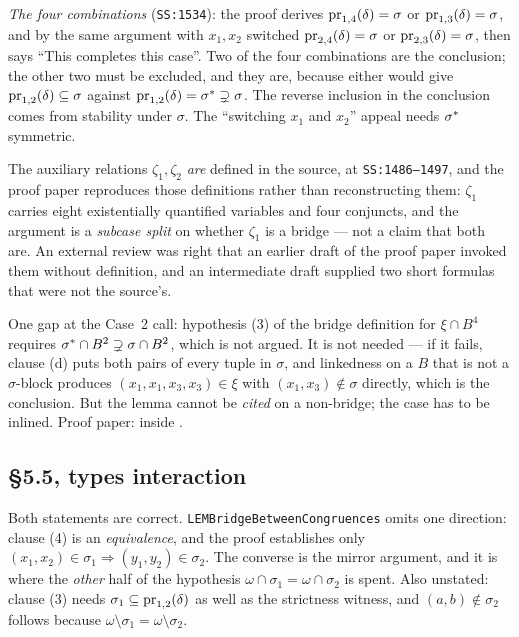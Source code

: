 \emph{The four combinations} (\texttt{SS:1534}): the proof derives
$\operatorname*{pr}_{1,4}(\delta)=\sigma$ or $\operatorname*{pr}_{1,3}(\delta)=\sigma$, and by the same
argument with $x_{1},x_{2}$ switched $\operatorname*{pr}_{2,4}(\delta)=\sigma$ or
$\operatorname*{pr}_{2,3}(\delta)=\sigma$, then says ``This completes this case''. Two of
the four combinations are the conclusion; the other two must be excluded, and
they are, because either would give $\operatorname*{pr}_{1,2}(\delta)\subseteq\sigma$
against $\operatorname*{pr}_{1,2}(\delta)=\sigma^{*}\supsetneq\sigma$. The reverse
inclusion in the conclusion comes from stability under $\sigma$. The
``switching $x_{1}$ and $x_{2}$'' appeal needs $\sigma^{*}$ symmetric.

The auxiliary relations $\zeta_{1},\zeta_{2}$ \emph{are} defined in the source,
at \texttt{SS:1486--1497}, and the proof paper reproduces those definitions
rather than reconstructing them: $\zeta_{1}$ carries eight existentially
quantified variables and four conjuncts, and the argument is a \emph{subcase
split} on whether $\zeta_{1}$ is a bridge --- not a claim that both are. An
external review was right that an earlier draft of the proof paper invoked them
without definition, and an intermediate draft supplied two short formulas that
were not the source's.

One gap at the Case~2 call: hypothesis (3) of the bridge definition for
$\xi\cap B^{4}$ requires $\sigma^{*}\cap B^{2}\supsetneq\sigma\cap B^{2}$,
which is not argued. It is not needed --- if it fails, clause (d) puts both
pairs of every tuple in $\sigma$, and linkedness on a $B$ that is not a
$\sigma$-block produces $(x_{1},x_{1},x_{3},x_{3})\in\xi$ with
$(x_{1},x_{3})\notin\sigma$ directly, which is the conclusion. But the lemma
cannot be \emph{cited} on a non-bridge; the case has to be inlined. Proof
paper: inside .

\subsection{\S5.5, types interaction}\label{sec:exp-55}

Both statements are correct. \texttt{LEMBridgeBetweenCongruences} omits one
direction: clause (4) is an \emph{equivalence}, and the proof establishes only
$(x_{1},x_{2})\in\sigma_{1}\Rightarrow(y_{1},y_{2})\in\sigma_{2}$. The converse
is the mirror argument, and it is where the \emph{other} half of the hypothesis
$\omega\cap\sigma_{1}=\omega\cap\sigma_{2}$ is spent. Also unstated: clause (3)
needs $\sigma_{1}\subseteq\operatorname*{pr}_{1,2}(\delta)$ as well as the strictness
witness, and $(a,b)\notin\sigma_{2}$ follows because
$\omega\setminus\sigma_{1}=\omega\setminus\sigma_{2}$.

